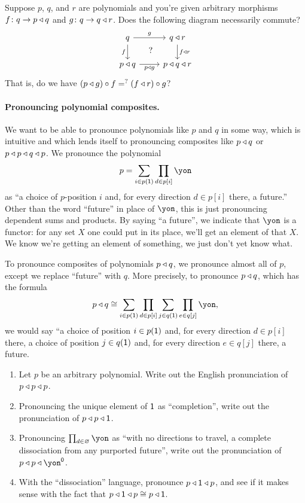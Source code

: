 \documentclass[DynamicalBook]{subfiles}
\begin{document}
\begin{exercise}
Suppose $p$, $q$, and $r$ are polynomials and you're given arbitrary morphisms $f\colon q\to p\mathbin{\triangleleft} q$ and $g\colon q\to q\mathbin{\triangleleft} r$. Does the following diagram necessarily commute?
\[
\begin{tikzcd}
	q\ar[r, "g"]\ar[d, "f"']&
	q\tri r\ar[d, "f\tri r"]\\
	p\tri q\ar[r, "p\tri g"']&
	p\tri q\tri r\ar[ul, phantom, "?"]
\end{tikzcd}
\]
That is, do we have $(p\mathbin{\triangleleft} g)\circ f=^?(f\mathbin{\triangleleft} r)\circ g$?
\end{exercise}

\paragraph{Pronouncing polynomial composites.}

We want to be able to pronounce polynomials like $p$ and $q$ in some way, which is intuitive and which lends itself to pronouncing composites like $p\mathbin{\triangleleft} q$ or $p\mathbin{\triangleleft} p\mathbin{\triangleleft} q\mathbin{\triangleleft} p$. We pronounce the polynomial
\[p=\sum_{i\in p(\1)}\prod_{d\in p[i]}\yon\]
as ``a choice of $p$-position $i$ and, for every direction $d\in p[i]$ there, a future.'' Other than the word ``future'' in place of $\yon$, this is just pronouncing dependent sums and products. By saying ``a future'', we indicate that $\yon$ is a functor: for any set $X$ one could put in its place, we'll get an element of that $X$. We know we're getting an element of something, we just don't yet know what.

To pronounce composites of polynomials $p\mathbin{\triangleleft} q$, we pronounce almost all of $p$, except we replace ``future'' with $q$. More precisely, to pronounce $p\mathbin{\triangleleft} q$, which has the formula
\[p\tri q\cong\sum_{i\in p(\1)}\prod_{d\in p[i]}\sum_{j\in q(\1)}\prod_{e\in q[j]}\yon,
\]
we would say ``a choice of position $i\in p(\textsf{1})$ and, for every direction $d\in p[i]$ there, a choice of position $j\in q(\textsf{1})$ and, for every direction $e\in q[j]$ there, a future.

\begin{exercise}
\begin{enumerate}
	\item Let $p$ be an arbitrary polynomial. Write out the English pronunciation of $p\mathbin{\triangleleft} p\mathbin{\triangleleft} p$.
	\item Pronouncing the unique element of $\textsf{1}$ as ``completion'', write out the pronunciation of $p\mathbin{\triangleleft} p\mathbin{\triangleleft} \textsf{1}$.
	\item Pronouncing $\prod_{d\in\varnothing}\yon$ as ``with no directions to travel, a complete dissociation from any purported future'', write out the pronunciation of $p\tri p\tri\yon^\0$.
	\item With the ``dissociation'' language, pronounce $p\mathbin{\triangleleft}\textsf{1}\mathbin{\triangleleft} p$, and see if it makes sense with the fact that $p\mathbin{\triangleleft}\textsf{1}\mathbin{\triangleleft} p\cong p\mathbin{\triangleleft} \textsf{1}$.
\qedhere
\end{enumerate}
\end{exercise}
\end{document}
